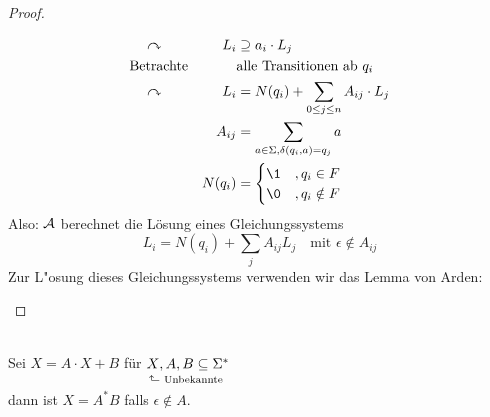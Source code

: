 \begin{proof}
\begin{description}[labelwidth=\widthof{\<=},leftmargin=!]
\begin{alignat*}{2}
			&\quad\curvearrowright & L_i &\supseteq a_i\cdot L_j\\
			&\text{Betrachte} &  & \text{alle Transitionen ab }q_i \\
			&\quad\curvearrowright & L_i &= N(q_i)+\sum_{0 \le j \le n} A_{ij}\cdot L_j\\
			&& A_{ij} &= \sum_{a \in \Sigma, \delta(q_i,a) = q_j} a \\
			&& N(q_i) &= 
				\begin{cases}
					\1 &, q_i\in F\\
					\0 &, q_i\notin F
				\end{cases}
		\end{alignat*}
		Also: $\mathcal{A}$ berechnet die Lösung eines Gleichungssystems
		\[ L_i=N(q_i) + \sum_j A_{ij}L_j \quad\text{mit }\epsilon\notin A_{ij} \]
		Zur L"osung dieses Gleichungssystems verwenden wir das Lemma von Arden:
	\end{description}
\end{proof}
\begin{lemma}\label{lem:arden}\ \\
	Sei $X=A\cdot X+B$ für $\underset{\vphantom{\big(}\ \mathrlap{\hspace{-4pt}\rotatebox[origin=c]{90}{$\Rsh$}\ \text{Unbekannte}}}{X} ,A,B\subseteq \Sigma^*$\\
	dann ist $X=A^*B$ falls $\epsilon\notin A$.
\end{lemma}
